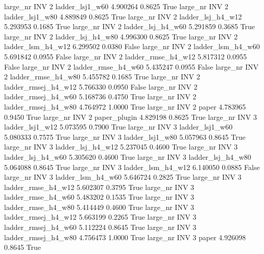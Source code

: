   large_nr      INV                 2     ladder_lsj1_w60   4.900264      0.8625    True
  large_nr      INV                 2     ladder_lsj1_w80   4.889849      0.8625    True
  large_nr      INV                 2   ladder_lsj_h4_w12   5.293953      0.1685    True
  large_nr      INV                 2   ladder_lsj_h4_w60   5.291859      0.3685    True
  large_nr      INV                 2   ladder_lsj_h4_w80   4.996300      0.8625    True
  large_nr      INV                 2   ladder_lsm_h4_w12   6.299502      0.0380   False
  large_nr      INV                 2   ladder_lsm_h4_w60   5.691842      0.0955   False
  large_nr      INV                 2  ladder_rmse_h4_w12   5.817312      0.0955   False
  large_nr      INV                 2  ladder_rmse_h4_w60   5.435247      0.0955   False
  large_nr      INV                 2  ladder_rmse_h4_w80   5.455782      0.1685    True
  large_nr      INV                 2 ladder_rmsej_h4_w12   5.766330      0.0950   False
  large_nr      INV                 2 ladder_rmsej_h4_w60   5.168736      0.4750    True
  large_nr      INV                 2 ladder_rmsej_h4_w80   4.764972      1.0000    True
  large_nr      INV                 2               paper   4.783965      0.9450    True
  large_nr      INV                 2        paper_plugin   4.829198      0.8625    True
  large_nr      INV                 3     ladder_lsj1_w12   5.073595      0.7900    True
  large_nr      INV                 3     ladder_lsj1_w60   5.080333      0.7575    True
  large_nr      INV                 3     ladder_lsj1_w80   5.057963      0.8645    True
  large_nr      INV                 3   ladder_lsj_h4_w12   5.237045      0.4600    True
  large_nr      INV                 3   ladder_lsj_h4_w60   5.305620      0.4600    True
  large_nr      INV                 3   ladder_lsj_h4_w80   5.064088      0.8645    True
  large_nr      INV                 3   ladder_lsm_h4_w12   6.140050      0.0885   False
  large_nr      INV                 3   ladder_lsm_h4_w60   5.646724      0.2825    True
  large_nr      INV                 3  ladder_rmse_h4_w12   5.602307      0.3795    True
  large_nr      INV                 3  ladder_rmse_h4_w60   5.483202      0.1535    True
  large_nr      INV                 3  ladder_rmse_h4_w80   5.414449      0.4600    True
  large_nr      INV                 3 ladder_rmsej_h4_w12   5.663199      0.2265    True
  large_nr      INV                 3 ladder_rmsej_h4_w60   5.112224      0.8645    True
  large_nr      INV                 3 ladder_rmsej_h4_w80   4.756473      1.0000    True
  large_nr      INV                 3               paper   4.926098      0.8645    True
